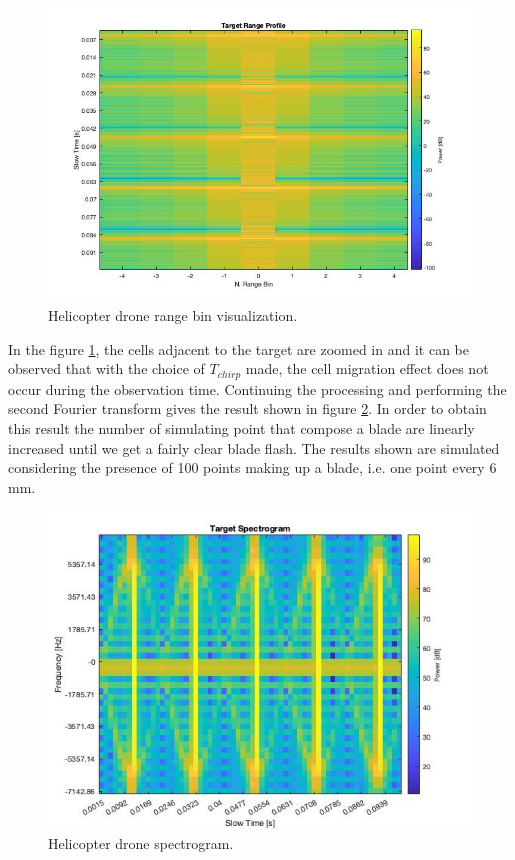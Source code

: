 \begin{figure}[h!]
\centering
\includegraphics[width=12cm]{FMCW mD analysis-chap4/img/helic_range_bin_example.jpg}
\caption{Helicopter drone range bin visualization.}
\label{helicrangebinprofile}
\end{figure}

In the figure \ref{helicrangebinprofile}, the cells adjacent to the target are zoomed in and it can be observed that with the choice of $T_{chirp}$ made, the cell migration effect does not occur during the observation time.
Continuing the processing and performing the second Fourier transform gives the result shown in figure \ref{helicspectexample}. In order to obtain this result the number of simulating point that compose a blade are linearly increased until we get a fairly clear blade flash. The results shown are simulated considering the presence of 100 points making up a blade, i.e. one point every 6 mm.

\begin{figure}[h!]
\centering
\includegraphics[width=12cm]{FMCW mD analysis-chap4/img/helic_spect_example2.jpg}
\caption{Helicopter drone spectrogram.}
\label{helicspectexample}
\end{figure}

